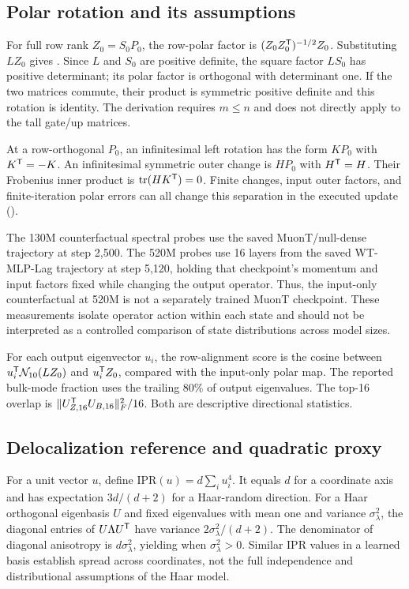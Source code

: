 \subsection{Polar rotation and its assumptions}

For full row rank $Z_0=S_0P_0$, the row-polar factor is $(Z_0Z_0^{{\mathsf{T}}})^{-1/2}Z_0$. Substituting $LZ_0$ gives . Since $L$ and $S_0$ are positive definite, the square factor $LS_0$ has positive determinant; its polar factor is orthogonal with determinant one. If the two matrices commute, their product is symmetric positive definite and this rotation is identity. The derivation requires $m\le n$ and does not directly apply to the tall gate/up matrices.

At a row-orthogonal $P_0$, an infinitesimal left rotation has the form $KP_0$ with $K^{{\mathsf{T}}}=-K$. An infinitesimal symmetric outer change is $HP_0$ with $H^{{\mathsf{T}}}=H$. Their Frobenius inner product is $\operatorname{tr}(HK^{{\mathsf{T}}})=0$. Finite changes, input outer factors, and finite-iteration polar errors can all change this separation in the executed update ().



The 130M counterfactual spectral probes use the saved MuonT/null-dense trajectory at step 2,500. The 520M probes use 16 layers from the saved WT-MLP-Lag trajectory at step 5,120, holding that checkpoint's momentum and input factors fixed while changing the output operator. Thus, the input-only counterfactual at 520M is not a separately trained MuonT checkpoint. These measurements isolate operator action within each state and should not be interpreted as a controlled comparison of state distributions across model sizes.

For each output eigenvector $u_i$, the row-alignment score is the cosine between $u_i^{{\mathsf{T}}}\mathcal{N}_{10}(LZ_0)$ and $u_i^{{\mathsf{T}}}Z_0$, compared with the input-only polar map. The reported bulk-mode fraction uses the trailing 80\% of output eigenvalues. The top-16 overlap is $\|U_{Z,16}^{{\mathsf{T}}}U_{B,16}\|_F^2/16$. Both are descriptive directional statistics.

\subsection{Delocalization reference and quadratic proxy}

For a unit vector $u$, define $\mathrm{IPR}(u)=d\sum_i u_i^4$. It equals $d$ for a coordinate axis and has expectation $3d/(d+2)$ for a Haar-random direction. For a Haar orthogonal eigenbasis $U$ and fixed eigenvalues with mean one and variance $\sigma_\lambda^2$, the diagonal entries of $U\Lambda U^{{\mathsf{T}}}$ have variance $2\sigma_\lambda^2/(d+2)$. The denominator of diagonal anisotropy is $d\sigma_\lambda^2$, yielding  when $\sigma_\lambda^2>0$. Similar IPR values in a learned basis establish spread across coordinates, not the full independence and distributional assumptions of the Haar model.

